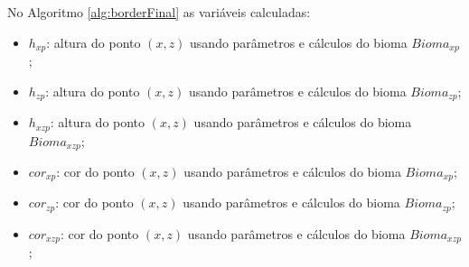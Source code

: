 No Algoritmo \ref{alg:borderFinal} as variáveis calculadas:
\begin{itemize}
    \item $h_{xp}$: altura do ponto $(x, z)$ usando parâmetros e cálculos do bioma $Bioma_{xp}$;
    \item $h_{zp}$: altura do ponto $(x, z)$ usando parâmetros e cálculos do bioma $Bioma_{zp}$;
    \item $h_{xzp}$: altura do ponto $(x, z)$ usando parâmetros e cálculos do bioma $Bioma_{xzp}$;
    \item $cor_{xp}$: cor do ponto $(x, z)$ usando parâmetros e cálculos do bioma $Bioma_{xp}$;
    \item $cor_{zp}$: cor do ponto $(x, z)$ usando parâmetros e cálculos do bioma $Bioma_{zp}$;
    \item $cor_{xzp}$: cor do ponto $(x, z)$ usando parâmetros e cálculos do bioma $Bioma_{xzp}$;
    
\end{itemize}

